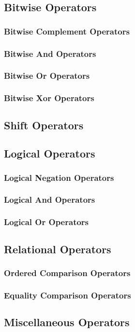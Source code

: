 \documentclass[10pt,twoside,titlepage]{article}
\begin{document}
\subsection{Bitwise Operators}
\subsubsection{Bitwise Complement Operators}
\subsubsection{Bitwise And Operators}
\subsubsection{Bitwise Or Operators}
\subsubsection{Bitwise Xor Operators}
\subsection{Shift Operators}
\subsection{Logical Operators}
\subsubsection{Logical Negation Operators}
\subsubsection{Logical And Operators}
\subsubsection{Logical Or Operators}
\subsection{Relational Operators}
\subsubsection{Ordered Comparison Operators}
\subsubsection{Equality Comparison Operators}
\subsection{Miscellaneous Operators}
\end{document}
